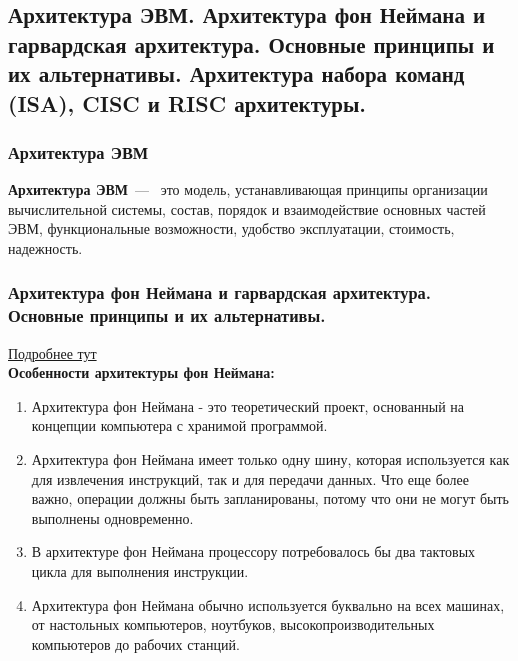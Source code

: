\subsection{Архитектура ЭВМ. Архитектура фон Неймана и гарвардская архитектура. Основные принципы и их альтернативы. Архитектура набора команд (ISA), CISC и RISC архитектуры.}

\subsubsection{Архитектура ЭВМ}
\textbf{Архитектура ЭВМ}~---~
это модель, устанавливающая принципы организации вычислительной системы, состав, 
порядок и взаимодействие основных частей ЭВМ, функциональные возможности, 
удобство эксплуатации, стоимость, надежность.

\subsubsection{Архитектура фон Неймана и гарвардская архитектура. Основные принципы и их альтернативы.}


\href{https://www.currentschoolnews.com/ru/%D0%BD%D0%BE%D0%B2%D0%BE%D1%81%D1%82%D0%B8-%D0%BE%D0%B1%D1%80%D0%B0%D0%B7%D0%BE%D0%B2%D0%B0%D0%BD%D0%B8%D1%8F/%D0%A0%D0%B0%D0%B7%D0%BD%D0%B8%D1%86%D0%B0-%D0%BC%D0%B5%D0%B6%D0%B4%D1%83-%D1%84%D0%BE%D0%BD-%D0%9D%D0%B5%D0%B9%D0%BC%D0%B0%D0%BD%D0%B0-%D0%B8-%D0%93%D0%B0%D1%80%D0%B2%D0%B0%D1%80%D0%B4%D1%81%D0%BA%D0%BE%D0%B9-%D0%B0%D1%80%D1%85%D0%B8%D1%82%D0%B5%D0%BA%D1%82%D1%83%D1%80%D1%8B/}{Подробнее тут}
\\

\textbf{Особенности архитектуры фон Неймана:}
\begin{enumerate}
	\item Архитектура фон Неймана - это теоретический проект, основанный на концепции компьютера с хранимой программой.
	\item Архитектура фон Неймана имеет только одну шину, которая используется как для извлечения инструкций, так и для передачи данных. Что еще более важно, операции должны быть запланированы, потому что они не могут быть выполнены одновременно.
	\item В архитектуре фон Неймана процессору потребовалось бы два тактовых цикла для выполнения инструкции.
	\item Архитектура фон Неймана обычно используется буквально на всех машинах, от настольных компьютеров, ноутбуков, высокопроизводительных компьютеров до рабочих станций.
\end{enumerate}

